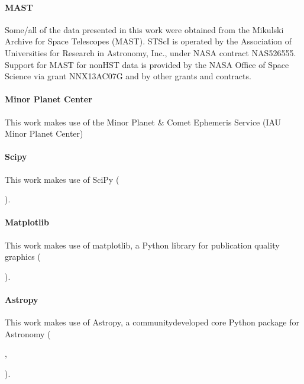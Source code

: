 \documentclass[letterpaper,11pt,english]{sphinxmanual}
\begin{document}
\paragraph{MAST}
\label{\detokenize{user/citations:mast}}
\sphinxAtStartPar
Some/all of the data presented in this work were obtained from the Mikulski
Archive for Space Telescopes (MAST). STScI is operated by the Association of
Universities for Research in Astronomy, Inc., under NASA contract NAS5\sphinxhyphen{}26555.
Support for MAST for non\sphinxhyphen{}HST data is provided by the NASA Office of Space
Science via grant NNX13AC07G and by other grants and contracts.


\paragraph{Minor Planet Center}
\label{\detokenize{user/citations:minor-planet-center}}
\sphinxAtStartPar
This work makes use of the Minor Planet \& Comet Ephemeris Service (IAU Minor
Planet Center)


\paragraph{Scipy}
\label{\detokenize{user/citations:scipy}}
\sphinxAtStartPar
This work makes use of SciPy
(%
\begin{footnote}[11]\sphinxAtStartFootnote
{}
%
\end{footnote}).


\paragraph{Matplotlib}
\label{\detokenize{user/citations:matplotlib}}
\sphinxAtStartPar
This work makes use of matplotlib, a Python library for publication quality graphics
(%
\begin{footnote}[12]\sphinxAtStartFootnote
{}
%
\end{footnote}).


\paragraph{Astropy}
\label{\detokenize{user/citations:astropy}}
\sphinxAtStartPar
This work makes use of Astropy, a community\sphinxhyphen{}developed core Python package for
Astronomy
(%
\begin{footnote}[13]\sphinxAtStartFootnote
{}
%
\end{footnote}, %
\begin{footnote}[14]\sphinxAtStartFootnote
{}
%
\end{footnote}).
\end{document}
